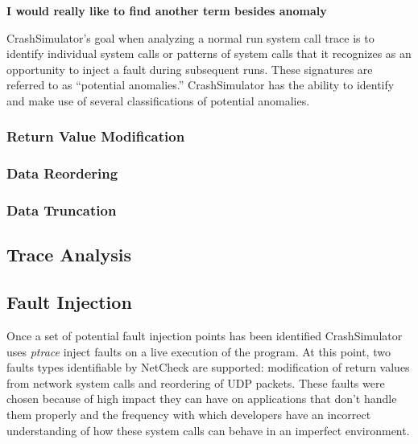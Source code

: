         \textbf{I would really like to find another term besides anomaly}

        CrashSimulator's goal when analyzing a normal run system call trace is to identify individual system calls or
        patterns of system calls that it recognizes as an opportunity to inject a fault during subsequent runs. These
        signatures are referred to as ``potential anomalies.'' CrashSimulator has the ability to identify and make use
        of several classifications of potential anomalies.

        \subsubsection{Return Value Modification}

        \subsubsection{Data Reordering}

        \subsubsection{Data Truncation}

    \subsection{Trace Analysis}



    \subsection{Fault Injection}



         Once a set of potential fault injection points has been identified CrashSimulator uses \emph{ptrace} inject
         faults on a live execution of the program. At this point, two faults types identifiable by NetCheck are
         supported: modification of return values from network system calls and reordering of UDP packets.  These faults
         were chosen because of high impact they can have on applications that don't handle them properly and the
         frequency with which developers have an incorrect understanding of how these system calls can behave in an
         imperfect environment.


